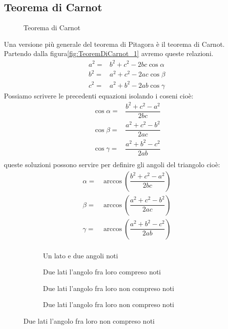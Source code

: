 \subsection{Teorema di Carnot}
\begin{figure}
	\centering
	
	\caption{Teorema di Carnot}
	\label{fig:TeoremDiCarnot_1}
\end{figure}
Una versione più generale del teorema di Pitagora è il teorema di Carnot. Partendo dalla figura\nobs\vref{fig:TeoremDiCarnot_1} avremo queste relazioni.
\begin{align*}
a^2=&b^2+c^2-2bc\cos\alpha\\
b^2=&a^2+c^2-2ac\cos\beta\\
c^2=&a^2+b^2-2ab\cos\gamma
\end{align*}
Possiamo scrivere le precedenti equazioni isolando i coseni cioè:
\begin{align*}
\cos\alpha=&\dfrac{b^2+c^2-a^2}{2bc}\\
\cos\beta=&\dfrac{a^2+c^2-b^2}{2ac}\\
\cos\gamma=&\dfrac{a^2+b^2-c^2}{2ab}\\
\end{align*}
queste soluzioni possono servire per definire gli angoli del triangolo cioè:
\begin{align*}
\alpha=&\arccos(\dfrac{b^2+c^2-a^2}{2bc})\\
\beta=&\arccos(\dfrac{a^2+c^2-b^2}{2ac})\\
\gamma=&\arccos(\dfrac{a^2+b^2-c^2}{2ab})\\
\end{align*}
\begin{figure}
	\begin{subfigure}[b]{.5\linewidth}
		\centering

	\caption{Un lato e due angoli noti}
	\label{fig:risTriangQqualunque_1}
	\end{subfigure}%
	\begin{subfigure}[b]{.5\linewidth}
		\centering
	
		\caption{Due lati l'angolo fra loro compreso noti}
		\label{fig:risTriangQqualunque_2}
	\end{subfigure}
	\begin{subfigure}[b]{.5\linewidth}
		\centering
		
		\caption{Due lati l'angolo fra loro non compreso noti}
		\label{fig:risTriangQqualunque_3}
	\end{subfigure}%
	\begin{subfigure}[b]{.5\linewidth}
		\centering
		
		\caption{Due lati l'angolo fra loro non compreso noti}
		\label{fig:risTriangQqualunque_4}
	\end{subfigure}
	\label{fig:RisoluzioneTriangoliQualunque}
\end{figure}
